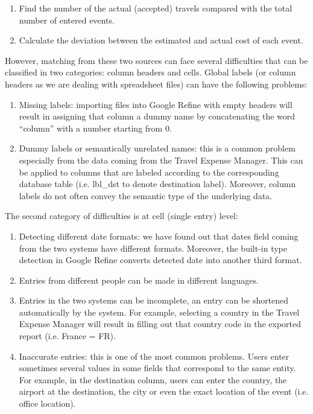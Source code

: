 \begin{enumerate}
\item  Find the number of the actual (accepted) travels compared with the total number of entered events.

\item  Calculate the deviation between the estimated and actual cost of each event.
\end{enumerate}

However, matching from these two sources can face several difficulties that can be classified in two categories: column headers and cells. Global labels (or column headers as we are dealing with spreadsheet files) can have the following problems:

\begin{enumerate}
\item  Missing labels: importing files into Google Refine with empty headers will result in assigning that column a dummy name by concatenating the word ``column'' with a number starting from 0.

\item  Dummy labels or semantically unrelated names: this is a common problem especially from the data coming from the Travel Expense Manager. This can be applied to columns that are labeled according to the corresponding database table (i.e. lbl\_dst to denote destination label). Moreover, column labels do not often convey the semantic type of the underlying data.
\end{enumerate}

The second category of difficulties is at cell (single entry) level:

\begin{enumerate}
\item  Detecting different date formats: we have found out that dates field coming from the two systems have different formats. Moreover, the built-in type detection in Google Refine converts detected date into another third format.

\item  Entries from different people can be made in different languages.

\item  Entries in the two systems can be incomplete, an entry can be shortened automatically by the system. For example, selecting a country in the Travel Expense Manager will result in filling out that country code in the exported report (i.e. France = FR).

\item  Inaccurate entries: this is one of the most common problems. Users enter sometimes several values in some fields that correspond to the same entity. For example, in the destination column, users can enter the country, the airport at the destination, the city or even the exact location of the event (i.e. office location).
\end{enumerate}

